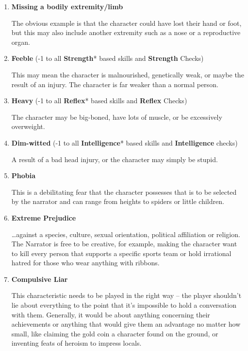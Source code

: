 \begin{enumerate}
    \item \textbf{Missing a bodily extremity/limb}
    
    The obvious example is that the character could have lost their hand or foot, but this may also include another extremity such as a nose or a reproductive organ.

    \item \textbf{Feeble} (-1 to all \textbf{Strength}* based skills and \textbf{Strength} Checks)
    
    This may mean the character is malnourished, genetically weak, or maybe the result of an injury. The character is far weaker than a normal person.

    \item \textbf{Heavy} (-1 to all \textbf{Reflex}* based skills and \textbf{Reflex} Checks)
    
    The character may be big-boned, have lots of muscle, or be excessively overweight.

    \item \textbf{Dim-witted} (-1 to all \textbf{Intelligence}* based skills and \textbf{Intelligence} checks)
    
    A result of a bad head injury, or the character may simply be stupid.

    \item \textbf{Phobia}
    
    This is a debilitating fear that the character possesses that is to be selected by the narrator and can range from heights to spiders or little children.

    \item \textbf{Extreme Prejudice}
    
    \ldots against a species, culture, sexual orientation, political affiliation or religion. The Narrator is free to be creative, for example, making the character want to kill every person that supports a specific sports team or hold irrational hatred for those who wear anything with ribbons.

    \item \textbf{Compulsive Liar}
    
    This characteristic needs to be played in the right way – the player shouldn’t lie about everything to the point that it’s impossible to hold a conversation with them. Generally, it would be about anything concerning their achievements or anything that would give them an advantage no matter how small, like claiming the gold coin a character found on the ground, or inventing feats of heroism to impress locals.


\end{enumerate}

